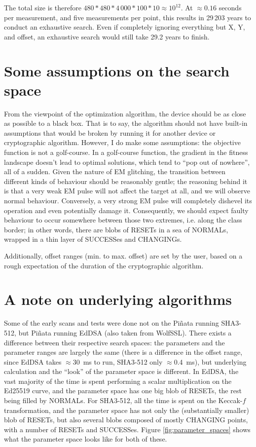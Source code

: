\documentclass[times, utf8, diplomski]{fer}
\begin{document}
The total size is therefore $480*480*4\,000*100*10\approx 10^{12}$.
At $\approx0.16$ seconds per measurement, and five measurements per point, this
results in 29\,203 years to conduct an exhaustive search. Even if completely
ignoring everything but X, Y, and offset, an exhaustive search would still
take 29.2 years to finish.



\section{Some assumptions on the search space}\label{sec:assumptions}
From the viewpoint of the optimization algorithm, the device should be as close
as possible to a black box. That is to say, the algorithm should not have built-in
assumptions that would be broken by running it for another device or cryptographic
algorithm. However, I do make some assumptions:
the objective function is not a golf-course. In a golf-course function, the
gradient in the fitness landscape doesn't lead to optimal solutions, which tend
to ``pop out of nowhere'', all of a sudden. Given the nature of EM glitching, the
transition between different kinds of behaviour should be reasonably gentle; the
reasoning behind it is that a very weak EM pulse will not affect the target at all,
and we will observe normal behaviour. Conversely, a very strong EM pulse will
completely dishevel its operation and even potentially damage it. Consequently,
we should expect faulty behaviour to occur somewhere between those two extremes,
i.e. along the class border; in other words, there are blobs of RESETs in a sea
of NORMALs, wrapped in a thin layer of SUCCESSes and CHANGINGs.

Additionally, offset ranges (min. to max. offset) are set by the user,
based on a rough expectation of the duration of the cryptographic algorithm.



\section{A note on underlying algorithms}\label{sec:note_on_algorithms}
Some of the early scans and tests were done not on the Piñata running SHA3-512,
but Piñata running EdDSA (also taken from WolfSSL). There exists a difference
between their respective search spaces: the parameters and the parameter ranges
are largely the same (there is a difference in the offset range, since EdDSA
takes $\approx$\SI{30}{\milli\second} to run, SHA3-512 only $\approx$\SI{0.4}{\milli\second}),
but underlying calculation and the ``look'' of the parameter space is different.
In EdDSA, the vast majority of the time is spent performing a scalar
multiplication on the Ed25519 curve, and the parameter space has one big
blob of RESETs, the rest being filled by NORMALs. For SHA3-512, all the
time is spent on the Keccak-$f$ transformation, and the parameter space
has not only the (substantially smaller) blob of RESETs, but also several
blobs composed of mostly CHANGING points, with a number of RESETs and SUCCESSes.
Figure \ref{fig:parameter_spaces} shows what the parameter space looks like
for both of these.
\end{document}
